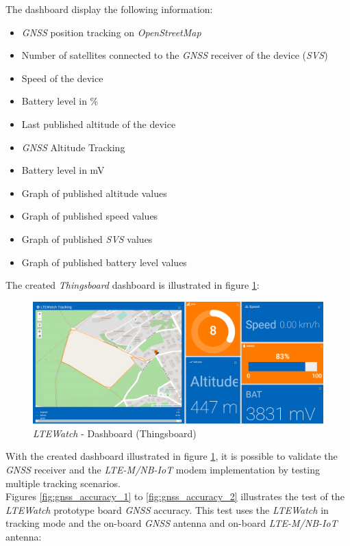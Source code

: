 \documentclass[Report.tex]{subfiles}
\begin{document}
The dashboard display the following information:
\begin{itemize}
\item \textit{GNSS} position tracking on \textit{OpenStreetMap}
\item Number of satellites connected to the \textit{GNSS} receiver of the device (\textit{SVS})
\item Speed of the device
\item Battery level in \si{\percent}
\item Last published altitude of the device
\item \textit{GNSS} Altitude Tracking
\item Battery level in \si{\milli\volt}
\item Graph of published altitude values
\item Graph of published speed values
\item Graph of published \textit{SVS} values
\item Graph of published battery level values\\
\end{itemize}

The created \textit{Thingsboard} dashboard is illustrated in figure \ref{fig:ltewatch_panel}:
\begin{figure}[H]
	\centering
	\includegraphics[width=1\textwidth]{Include/Figure/result/ltewatch_panel.png}
	\caption{\textit{LTEWatch} - Dashboard (Thingsboard)}
	\label{fig:ltewatch_panel}
\end{figure}

With the created dashboard illustrated in figure \ref{fig:ltewatch_panel}, it is possible to validate the \textit{GNSS} receiver and the \textit{LTE-M/NB-IoT} modem implementation by testing multiple tracking scenarios.\\

Figures \ref{fig:gnss_accuracy_1} to \ref{fig:gnss_accuracy_2} illustrates the test of the \textit{LTEWatch} prototype board \textit{GNSS} accuracy. This test uses the \textit{LTEWatch} in tracking mode and the on-board \textit{GNSS} antenna and on-board \textit{LTE-M/NB-IoT} antenna:
\end{document}
